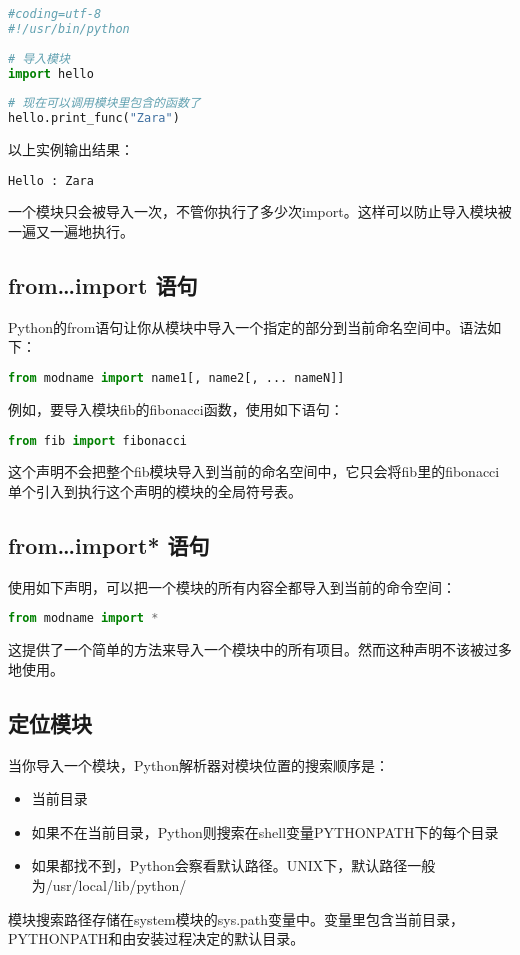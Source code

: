 \begin{lstlisting}[language=Python]
#coding=utf-8
#!/usr/bin/python
 
# 导入模块
import hello
 
# 现在可以调用模块里包含的函数了
hello.print_func("Zara")
\end{lstlisting}
以上实例输出结果：
\begin{lstlisting}[language=Python]
Hello : Zara
\end{lstlisting}
一个模块只会被导入一次，不管你执行了多少次import。这样可以防止导入模块被一遍又一遍地执行。



\subsection{from…import 语句}
Python的from语句让你从模块中导入一个指定的部分到当前命名空间中。语法如下：
\begin{lstlisting}[language=Python]
from modname import name1[, name2[, ... nameN]]
\end{lstlisting}
例如，要导入模块fib的fibonacci函数，使用如下语句：
\begin{lstlisting}[language=Python]
from fib import fibonacci
\end{lstlisting}
这个声明不会把整个fib模块导入到当前的命名空间中，它只会将fib里的fibonacci单个引入到执行这个声明的模块的全局符号表。



\subsection{from…import* 语句}
使用如下声明，可以把一个模块的所有内容全都导入到当前的命令空间：
\begin{lstlisting}[language=Python]
from modname import *
\end{lstlisting}
这提供了一个简单的方法来导入一个模块中的所有项目。然而这种声明不该被过多地使用。



\subsection{定位模块}
当你导入一个模块，Python解析器对模块位置的搜索顺序是：
\begin{itemize}
\item 当前目录
\item 如果不在当前目录，Python则搜索在shell变量PYTHONPATH下的每个目录
\item 如果都找不到，Python会察看默认路径。UNIX下，默认路径一般为/usr/local/lib/python/
\end{itemize}
模块搜索路径存储在system模块的sys.path变量中。变量里包含当前目录，PYTHONPATH和由安装过程决定的默认目录。



